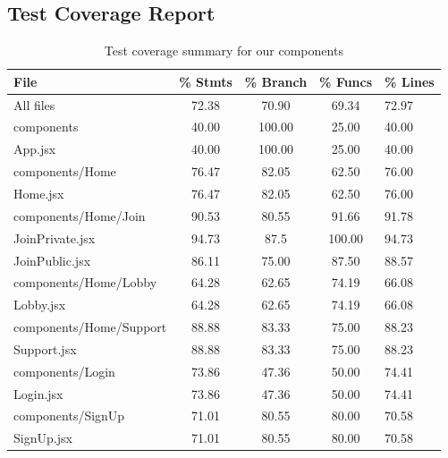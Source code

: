 \subsection{Test Coverage Report}

\begin{table}[H]
\centering
\begin{tabular}{|l|c|c|c|l|}
\hline
\textbf{File} & \textbf{\% Stmts} & \textbf{\% Branch} & \textbf{\% Funcs} & \textbf{\% Lines} \\ \hline
All files                & 72.38  & 70.90  & 69.34  & 72.97 \\ \hline
components               & 40.00  & 100.00 & 25.00  & 40.00 \\ \hline
\hspace{1em}App.jsx      & 40.00  & 100.00 & 25.00  & 40.00 \\ \hline
components/Home          & 76.47  & 82.05  & 62.50  & 76.00 \\ \hline
\hspace{1em}Home.jsx     & 76.47  & 82.05  & 62.50  & 76.00 \\ \hline
components/Home/Join     & 90.53  & 80.55  & 91.66  & 91.78  \\ \hline
\hspace{1em}JoinPrivate.jsx & 94.73  & 87.5  & 100.00  & 94.73 \\ \hline
\hspace{1em}JoinPublic.jsx  & 86.11  & 75.00  & 87.50  & 88.57 \\ \hline
components/Home/Lobby  & 64.28 & 62.65  & 74.19 & 66.08 \\ \hline
\hspace{1em}Lobby.jsx  & 64.28 & 62.65  & 74.19 & 66.08 \\ \hline
components/Home/Support  & 88.88 & 83.33  & 75.00 & 88.23 \\ \hline
\hspace{1em}Support.jsx  & 88.88 & 83.33  & 75.00 & 88.23 \\ \hline
components/Login         & 73.86  & 47.36  & 50.00  & 74.41 \\ \hline
\hspace{1em}Login.jsx    & 73.86  & 47.36  & 50.00  & 74.41 \\ \hline
components/SignUp        & 71.01  & 80.55  & 80.00  & 70.58 \\ \hline
\hspace{1em}SignUp.jsx   & 71.01  & 80.55  & 80.00  & 70.58 \\ \hline
\end{tabular}
\caption{Test coverage summary for our components}
\label{table:test-coverage}
\end{table}

